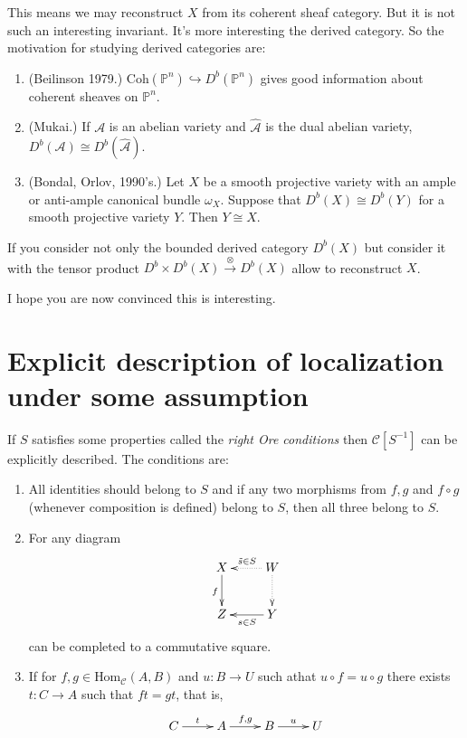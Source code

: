 This means we may reconstruct $X$ from its
coherent sheaf category. But it is not such
an interesting invariant. It's more
interesting the derived category. So the
motivation for studying derived categories
are:

\begin{enumerate}
\item (Beilinson 1979.)
$\text{Coh}(\mathbb{P}^n)\hookrightarrow
D^b(\mathbb{P}^n)$ gives good information
about coherent sheaves on $\mathbb{P}^n$.
\item (Mukai.) If $\mathcal{A}$ is an abelian
variety and $\hat{\mathcal{A}}$ is
the dual abelian variety,
$D^b(\mathcal{A})\cong
D^b(\hat{\mathcal{A}})$.
\item (Bondal, Orlov, 1990's.) Let $X$ be a
smooth projective variety with an
ample or anti-ample canonical bundle
$\omega_X$. Suppose that $D^b(X)\cong D^b(Y)$
for a smooth projective variety $Y$. Then $Y
\cong X$.
\end{enumerate}

\begin{remark}
\label{dcos-label-001}
If you consider not only the bounded derived
category $D^b(X)$ but consider it with the
tensor product $D^b \times D^b(X)
\xrightarrow{\otimes} D^b(X)$ allow to
reconstruct $X$.
\end{remark}

I hope you are now convinced this is
interesting.

\section{Explicit description of localization
under
some assumption}
\label{dcos-label-002}

If $S$ satisfies some properties called the
{\it right Ore conditions} then
$\mathcal{C}[S^{-1}]$ can be explicitly
described. The conditions are:

\begin{enumerate}
\item All identities should belong to $S$ and
if any two morphisms from $f,g$
and $f \circ g$ (whenever composition is
defined) belong to $S$, then all three belong
to $S$.
\item For any diagram
$$
\xymatrix{
X\ar[d]_{f}&W\ar@{.>}[l]_{\tilde{s}\in
S}\ar@{.>}[d]\\
Z&\ar[l]^{s\in S}Y
}
$$
can be completed to a commutative square.
\item If for $f,g\in
\text{Hom}_{\mathcal{C}}(A,B)$ and $u:B \to
U$ such athat
$u\circ f=u\circ g$ there exists $t:C \to A$
such that $ft=gt$, that is,
$$
\xymatrix{
C\ar[r]^{t}&A\ar[r]^{f,g}&B\ar[r]^{u}&U
}
$$
\end{enumerate}

